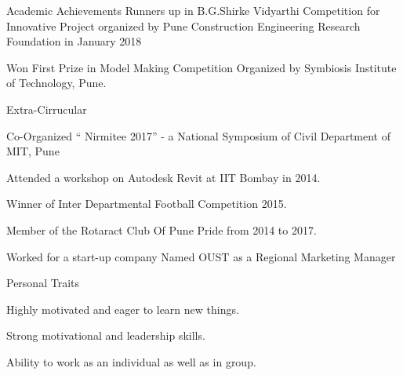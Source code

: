 \documentclass{resume} %
\begin{document}




%


\begin{rSection}{Academic Achievements} 
 Runners up in B.G.Shirke Vidyarthi Competition for Innovative Project organized by Pune Construction Engineering Research Foundation in January 2018
\item Won First Prize in Model Making Competition Organized by Symbiosis Institute of Technology, Pune.
\end{rSection}

\newpage

\begin{rSection}{Extra-Cirrucular} \itemsep -3pt
\item Co-Organized “ Nirmitee 2017” - a National Symposium of Civil Department of MIT, Pune
\item Attended a workshop on Autodesk Revit at IIT Bombay in 2014.
\item Winner of Inter Departmental Football Competition 2015.
\item Member of the  Rotaract Club Of Pune Pride from 2014 to 2017.
\item Worked for a start-up company Named OUST as a Regional Marketing Manager

\end{rSection}

\begin{rSection}{Personal Traits}
\item Highly motivated and eager to learn new things.
\item Strong motivational and leadership skills.
\item Ability to work as an individual as well as in group.
\end{rSection}
\end{document}
